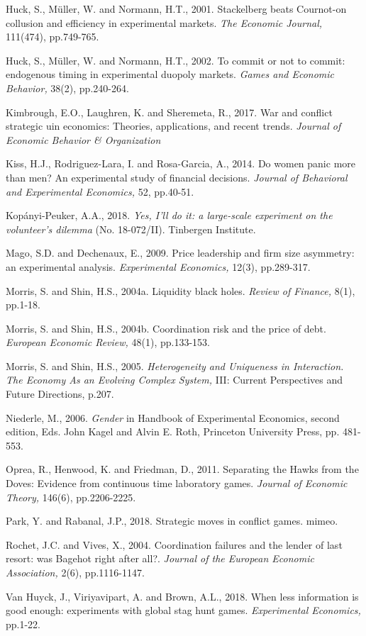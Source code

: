 \documentclass[12pt,english]{article}
\begin{document}
\begin{thebibliography}{10}
\bibitem{}Huck, S., M\"{u}ller, W. and Normann, H.T., 2001. Stackelberg beats Cournot-on collusion and efficiency in experimental markets. \textit{The Economic Journal,} 111(474), pp.749-765.

\bibitem{}Huck, S., M\"{u}ller, W. and Normann, H.T., 2002. To commit or not to commit: endogenous timing in experimental duopoly markets. \textit{Games and Economic Behavior,} 38(2), pp.240-264.

\bibitem{} Kimbrough, E.O., Laughren, K. and Sheremeta, R., 2017. War and conflict strategic uin economics: Theories, applications, and recent trends. \textit{Journal of Economic Behavior \& Organization}

\bibitem{} Kiss, H.J., Rodriguez-Lara, I. and Rosa-Garcia, A., 2014. Do women panic more than men? An experimental study of financial decisions. \textit{Journal of Behavioral and Experimental Economics,} 52, pp.40-51.

\bibitem{} Kop\'{a}nyi-Peuker, A.A., 2018. \textit{Yes, I'll do it: a large-scale experiment on the volunteer's dilemma} (No. 18-072/II). Tinbergen Institute.

\bibitem{} Mago, S.D. and Dechenaux, E., 2009. Price leadership and firm size asymmetry: an experimental analysis. \textit{Experimental Economics,} 12(3), pp.289-317.

\bibitem{} Morris, S. and Shin, H.S., 2004a. Liquidity black holes. \textit{Review of Finance,} 8(1), pp.1-18.

\bibitem{}  Morris, S. and Shin, H.S., 2004b. Coordination risk and the price of debt. \textit{European Economic Review,} 48(1), pp.133-153.

\bibitem{} Morris, S. and Shin, H.S., 2005. \textit{Heterogeneity and Uniqueness in Interaction. The Economy As an Evolving Complex System,} III: Current Perspectives and Future Directions, p.207.


\bibitem{} Niederle, M., 2006. \textit{Gender} in Handbook of Experimental Economics, second edition, Eds. John Kagel and Alvin E. Roth, Princeton University Press, pp. 481-553.

\bibitem{} Oprea, R., Henwood, K. and Friedman, D., 2011. Separating the Hawks from the Doves: Evidence from continuous time laboratory games. \textit{Journal of Economic Theory,} 146(6), pp.2206-2225.

\bibitem{} Park, Y. and Rabanal, J.P., 2018. Strategic moves in conflict games. mimeo.

\bibitem{} Rochet, J.C. and Vives, X., 2004. Coordination failures and the lender of last resort: was Bagehot right after all?. \textit{Journal of the European Economic Association,} 2(6), pp.1116-1147.

\bibitem{} Van Huyck, J., Viriyavipart, A. and Brown, A.L., 2018. When less information is good enough: experiments with global stag hunt games. \textit{Experimental Economics,} pp.1-22.


\end{thebibliography}
\end{document}
